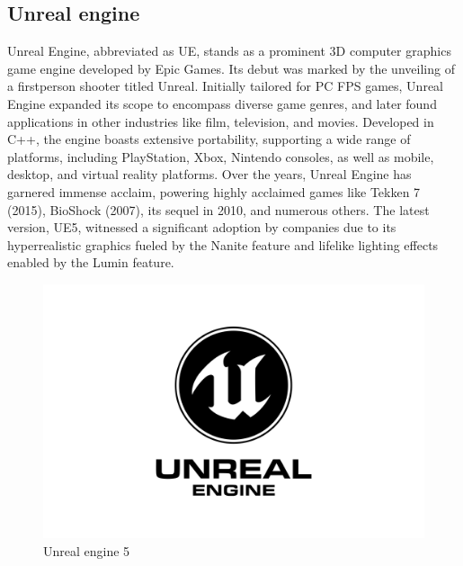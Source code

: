 \documentclass[12pt]{book}
\begin{document}
\subsection{Unreal engine}
Unreal Engine, abbreviated as UE, stands as a prominent 3D computer graphics game engine developed by Epic Games.
Its debut was marked by the unveiling of a first\-person shooter titled Unreal. Initially tailored for PC FPS games,
Unreal Engine expanded its scope to encompass diverse game genres, and later found applications in other industries like film,
television, and movies. Developed in C++, the engine boasts extensive portability, supporting a wide range of platforms,
including PlayStation, Xbox, Nintendo consoles, as well as mobile, desktop, and virtual reality platforms.
Over the years, Unreal Engine has garnered immense acclaim, powering highly acclaimed games like Tekken 7 (2015), BioShock (2007),
its sequel in 2010, and numerous others. The latest version, UE5, witnessed a significant adoption by companies due to its hyper\-realistic graphics fueled by the Nanite
feature and life\-like lighting effects enabled by the Lumin feature.
\begin{figure}[!h]
    \centering
    \includegraphics[scale=0.05]{./Figures/Images/unreal.png}
    \caption{Unreal engine 5}
    \label{Unreal engine 5}
\end{figure}

\newpage
\end{document}
